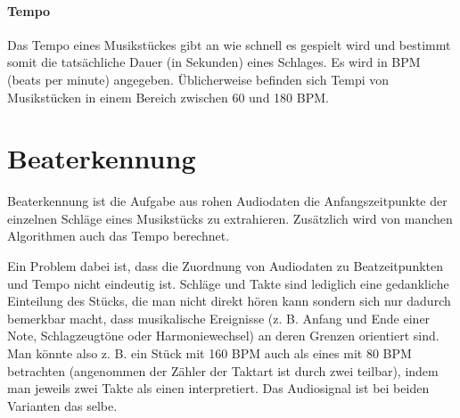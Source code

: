 {	\paragraph{Tempo}
	{
		Das Tempo eines Musikstückes gibt an wie schnell es gespielt wird
			und bestimmt somit die tatsächliche Dauer (in Sekunden) eines Schlages.
		Es wird in BPM (beats per minute) angegeben.
		Üblicherweise befinden sich Tempi von Musikstücken in einem Bereich zwischen 60 und 180 BPM.
	}
}

\section{Beaterkennung}
{
	Beaterkennung ist die Aufgabe aus rohen Audiodaten die Anfangszeitpunkte der einzelnen Schläge eines Musikstücks zu extrahieren.
	Zusätzlich wird von manchen Algorithmen auch das Tempo berechnet.

	Ein Problem dabei ist,
		dass die Zuordnung von Audiodaten zu Beatzeitpunkten und Tempo nicht eindeutig ist.
	Schläge und Takte sind lediglich eine gedankliche Einteilung des Stücks,
		die man nicht direkt hören kann
		sondern sich nur dadurch bemerkbar macht,
		dass musikalische Ereignisse
		(z. B. Anfang und Ende einer Note, Schlagzeugtöne oder Harmoniewechsel)
		an deren Grenzen orientiert sind.
	Man könnte also z. B. ein Stück mit 160 BPM auch als eines mit 80 BPM betrachten
		(angenommen der Zähler der Taktart ist durch zwei teilbar),
		indem man jeweils zwei Takte als einen interpretiert.
	Das Audiosignal ist bei beiden Varianten das selbe.
}
